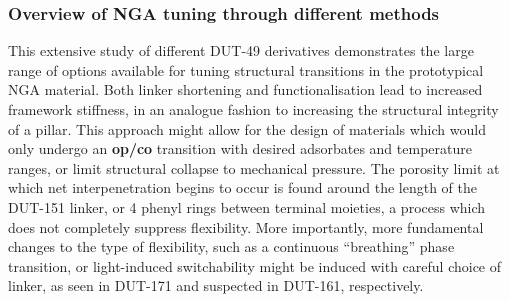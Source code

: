 \subsubsection{Overview of NGA tuning through different methods}

This extensive study of different DUT-49 derivatives demonstrates the 
large range of options available for tuning structural 
transitions in the prototypical NGA material. Both linker 
shortening and functionalisation lead to increased framework
stiffness, in an analogue fashion to increasing the 
structural integrity of a pillar. This approach might allow 
for the design of materials which would only undergo an 
\textbf{op/co} transition with desired adsorbates and
temperature ranges, or limit structural collapse to mechanical 
pressure. The porosity limit at which net interpenetration begins
to occur is found around the length of the DUT-151 linker, 
or 4 phenyl rings between terminal moieties, a process which does 
not completely suppress flexibility. More importantly, more 
fundamental changes to the type of flexibility, such as 
a continuous ``breathing'' phase transition, or light-induced
switchability might be induced with careful choice of linker,
as seen in DUT-171 and suspected in DUT-161, respectively.